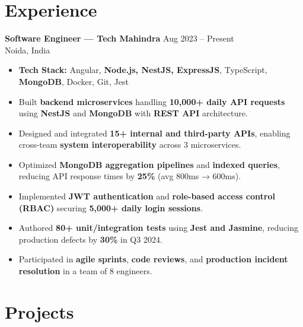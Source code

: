 \documentclass[letterpaper,11pt]{article}
\begin{document}
\section{Experience}
\textbf{Software Engineer — Tech Mahindra} \hfill Aug 2023 -- Present \\
Noida, India
\begin{itemize}
\item \textbf{Tech Stack:} Angular, \textbf{Node.js, NestJS, ExpressJS}, TypeScript, \textbf{MongoDB}, Docker, Git, Jest
\item Built \textbf{backend microservices} handling \textbf{10,000+ daily API requests} using \textbf{NestJS} and \textbf{MongoDB} with \textbf{REST API} architecture.
\item Designed and integrated \textbf{15+ internal and third-party APIs}, enabling cross-team \textbf{system interoperability} across 3 microservices.
\item Optimized \textbf{MongoDB aggregation pipelines} and \textbf{indexed queries}, reducing API response times by \textbf{25\%} (avg 800ms → 600ms).
\item Implemented \textbf{JWT authentication} and \textbf{role-based access control (RBAC)} securing \textbf{5,000+ daily login sessions}.
\item Authored \textbf{80+ unit/integration tests} using \textbf{Jest and Jasmine}, reducing production defects by \textbf{30\%} in Q3 2024.
\item Participated in \textbf{agile sprints}, \textbf{code reviews}, and \textbf{production incident resolution} in a team of 8 engineers.
\end{itemize}
\vspace{-10pt}

\section{Projects}
\end{document}
